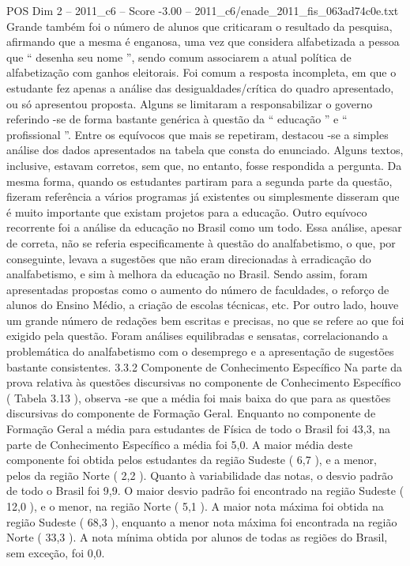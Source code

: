 \begin{textsample}{POS Dim 2 – 2011\_c6 – Score -3.00 – 2011\_c6/enade\_2011\_fis\_063ad74c0e.txt}
Grande também foi o número de alunos que criticaram o resultado da pesquisa, afirmando que a mesma é enganosa, uma vez que considera alfabetizada a pessoa que “ desenha seu nome ”, sendo comum associarem a atual política de alfabetização com ganhos eleitorais.
Foi comum a resposta incompleta, em que o estudante fez apenas a análise das desigualdades/crítica do quadro apresentado, ou só apresentou proposta.
Alguns se limitaram a responsabilizar o governo referindo -se de forma bastante genérica à questão da “ educação ” e “ profissional ”.
Entre os equívocos que mais se repetiram, destacou -se a simples análise dos dados apresentados na tabela que consta do enunciado.
Alguns textos, inclusive, estavam corretos, sem que, no entanto, fosse respondida a pergunta.
Da mesma forma, quando os estudantes partiram para a segunda parte da questão, fizeram referência a vários programas já existentes ou simplesmente disseram que é muito importante que existam projetos para a educação.
Outro equívoco recorrente foi a análise da educação no Brasil como um todo.
Essa análise, apesar de correta, não se referia especificamente à questão do analfabetismo, o que, por conseguinte, levava a sugestões que não eram direcionadas à erradicação do analfabetismo, e sim à melhora da educação no Brasil.
Sendo assim, foram apresentadas propostas como o aumento do número de faculdades, o reforço de alunos do Ensino Médio, a criação de escolas técnicas, etc.
Por outro lado, houve um grande número de redações bem escritas e precisas, no que se refere ao que foi exigido pela questão.
Foram análises equilibradas e sensatas, correlacionando a problemática do analfabetismo com o desemprego e a apresentação de sugestões bastante consistentes. 3.3.2 Componente de Conhecimento Específico Na parte da prova relativa às questões discursivas no componente de Conhecimento Específico ( Tabela 3.13 ), observa -se que a média foi mais baixa do que para as questões discursivas do componente de Formação Geral.
Enquanto no componente de Formação Geral a média para estudantes de Física de todo o Brasil foi 43,3, na parte de Conhecimento Específico a média foi 5,0.
A maior média deste componente foi obtida pelos estudantes da região Sudeste ( 6,7 ), e a menor, pelos da região Norte ( 2,2 ).
Quanto à variabilidade das notas, o desvio padrão de todo o Brasil foi 9,9.
O maior desvio padrão foi encontrado na região Sudeste ( 12,0 ), e o menor, na região Norte ( 5,1 ).
A maior nota máxima foi obtida na região Sudeste ( 68,3 ), enquanto a menor nota máxima foi encontrada na região Norte ( 33,3 ).
A nota mínima obtida por alunos de todas as regiões do Brasil, sem exceção, foi 0,0.

\end{textsample}
